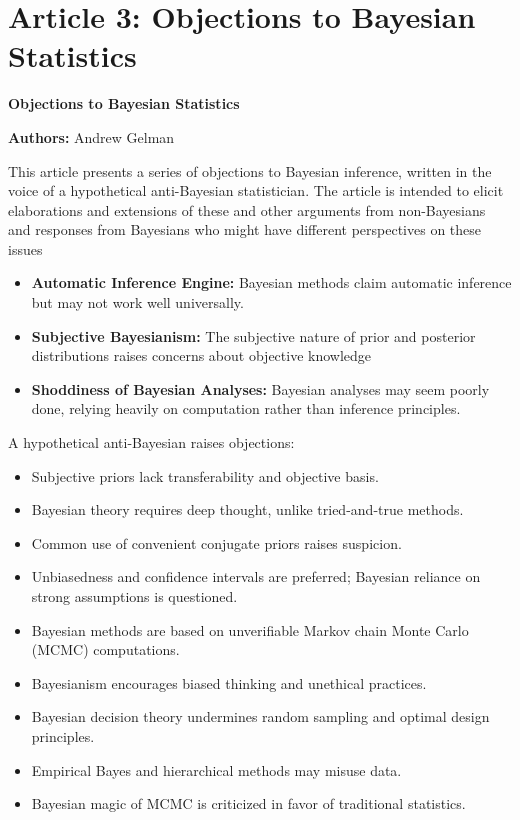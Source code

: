 \documentclass[dvipsnames,mathserif]{beamer}
\begin{document}
{\section{Article 3: Objections to Bayesian Statistics}
\begin{frame}
    \begin{center}
    \large \textbf{Objections to Bayesian Statistics}\\
    \end{center}
    \footnotesize
      \textbf{Authors:} Andrew Gelman\\
      \begin{block}{}
      This article presents a series of objections to Bayesian inference, written
in the voice of a hypothetical anti-Bayesian statistician. The article is intended to
elicit elaborations and extensions of these and other arguments from non-Bayesians
and responses from Bayesians who might have different perspectives on these issues
       \end{block}
          \begin{itemize}
              \item \textbf{Automatic Inference Engine:} Bayesian methods claim automatic inference but may not work well universally.
              \item \textbf{Subjective Bayesianism:} The subjective nature of prior and posterior distributions raises concerns about objective knowledge
              \item \textbf{Shoddiness of Bayesian Analyses:} Bayesian analyses may seem poorly done, relying heavily on computation rather than inference principles.
          \end{itemize}
      \end{frame}  

\begin{frame}
A hypothetical anti-Bayesian raises objections:
\begin{itemize}
  \item Subjective priors lack transferability and objective basis.
  \item Bayesian theory requires deep thought, unlike tried-and-true methods.
  \item Common use of convenient conjugate priors raises suspicion.
  \item Unbiasedness and confidence intervals are preferred; Bayesian reliance on strong assumptions is questioned.
  \item Bayesian methods are based on unverifiable Markov chain Monte Carlo (MCMC) computations.
  \item Bayesianism encourages biased thinking and unethical practices.
  \item Bayesian decision theory undermines random sampling and optimal design principles.
  \item Empirical Bayes and hierarchical methods may misuse data.
  \item Bayesian magic of MCMC is criticized in favor of traditional statistics.
\end{itemize}
\end{frame}

}
\end{document}
